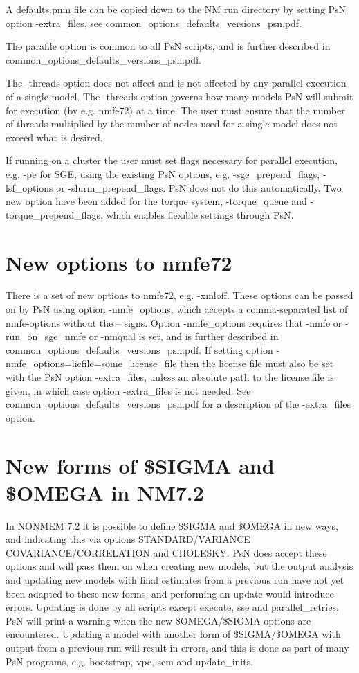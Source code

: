 A defaults.pnm file can be copied down to the NM run directory by setting PsN option -extra\_files, see common\_options\_defaults\_versions\_psn.pdf.

The parafile option is common to all PsN scripts, and is further described in common\_options\_defaults\_versions\_psn.pdf.

The -threads option does not affect and is not affected by any parallel execution of a single model. The -threads option governs how many models PsN will submit for execution (by e.g. nmfe72) at a time. The user must ensure that the number of threads multiplied by the number of nodes used for a single model does not exceed what is desired. 

If running on a cluster the user must set flags necessary for parallel execution, e.g. -pe for SGE, using the existing PsN options, e.g. -sge\_prepend\_flags, -lsf\_options or -slurm\_prepend\_flags. PsN does not do this automatically. Two new option have been added for the torque system, -torque\_queue and -torque\_prepend\_flags, which enables flexible settings through PsN.


\section{New options to nmfe72}

There is a set of new options to nmfe72, e.g. -xmloff. These options can be passed on by PsN using option -nmfe\_options, which accepts a comma-separated list of nmfe-options without the – signs. Option -nmfe\_options requires that -nmfe or -run\_on\_sge\_nmfe or -nmqual is set, and is further described in common\_options\_defaults\_versions\_psn.pdf. If setting option -nmfe\_options=licfile=some\_license\_file then the license file must also be set with the PsN option -extra\_files, unless an absolute path to the license file is given, in which case option -extra\_files is not needed. See common\_options\_defaults\_versions\_psn.pdf for a description of the -extra\_files option.

\section{New forms of \$SIGMA and \$OMEGA in NM7.2}

In NONMEM 7.2 it is possible to define \$SIGMA and \$OMEGA in new ways, and indicating this via options STANDARD/VARIANCE COVARIANCE/CORRELATION and CHOLESKY. PsN does accept these options and will pass them on when creating new models, but the output analysis and updating new models with final estimates from a previous run have not yet been adapted to these new forms, and performing an update would introduce errors. Updating is done by all scripts except execute, sse and parallel\_retries. PsN will print a warning when the new \$OMEGA/\$SIGMA options are encountered. Updating a model with another form of \$SIGMA/\$OMEGA with output from a previous run will result in errors, and this is done as part of many PsN programs, e.g. bootstrap, vpc, scm and update\_inits. 

